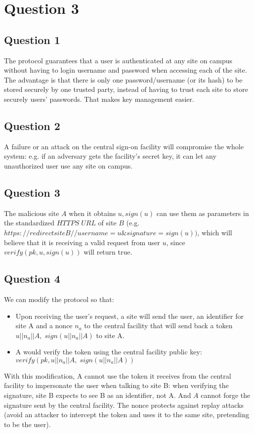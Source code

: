 \documentclass{article}
\begin{document}
\section{Question 3}

\subsection{Question 1}
The protocol guarantees that a user is authenticated at any site on campus without having to login username and password when accessing each of the site. The advantage is that there is only one password/username (or its hash) to be stored securely by one trusted party, instead of having to trust each site to store securely users' passwords. That makes key management easier.

\subsection{Question 2}
A failure or an attack on the central sign-on facility will compromise the whole system: e.g. if an adversary gets the facility's secret key, it can let any unauthorized user use any site on campus.

\subsection{Question 3}
The malicious site $A$ when it obtains $u, sign(u)$ can use them as parameters in the standardized $HTTPS \; URL$ of site $B$ (e.g. $https://redirectsiteB//username=u\&signature=sign(u))$, which will believe that it is receiving a valid request from user $u$, since $verify(pk, u, sign(u))$ will return true. 

\subsection{Question 4}
We can modify the protocol so that:
\begin{itemize}
	 \item Upon receiving the user's request, a site will send the user, an identifier for site A and a nonce $n_{a}$ to the central facility that will send back a token $u||n_{a}||A, \; sign(u||n_{a}||A)$ to site A. 
	 \item A would verify the token using the central facility public key: $verify(pk, u||n_{a}||A, \; sign(u||n_{a}||A))$
	\end{itemize}
With this modification, A cannot use the token it receives from the central facility to impersonate the user when talking to site B: when verifying the signature, site B expects to see B as an identifier, not A. And $A$ cannot forge the signature sent by the central facility. The nonce protects against replay attacks (avoid an attacker to intercept the token and uses it to the same site, pretending to be the user).
\end{document}
